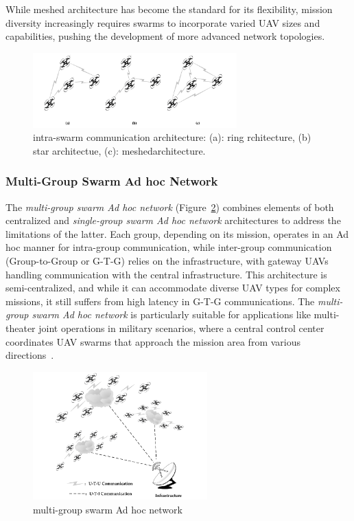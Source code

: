While meshed architecture has become the standard for its flexibility, mission diversity increasingly requires swarms to incorporate varied UAV sizes and capabilities, pushing the development of more advanced network topologies.





\begin{figure}[ht]
\centering
\includegraphics[width=0.7\textwidth]{Figures/Chapter1/Section5/3.png}
\caption{intra-swarm communication architecture: (a): ring rchitecture, (b) star architectue, (c): meshedarchitecture. \cite{Chen2020}}
\label{fig:intra-swarm communication architecture}
\end{figure}


\subsubsection{Multi-Group Swarm Ad hoc Network}

The \textit{multi-group swarm Ad hoc network} (Figure~\ref{fig:multi-group swarm Ad hoc network}) combines elements of both centralized and \textit{single-group swarm Ad hoc network} architectures to address the limitations of the latter. Each group, depending on its mission, operates in an Ad hoc manner for intra-group communication, while inter-group communication (Group-to-Group or G-T-G) relies on the infrastructure, with gateway UAVs handling communication with the central infrastructure. This architecture is semi-centralized, and while it can accommodate diverse UAV types for complex missions, it still suffers from high latency in G-T-G communications. The \textit{multi-group swarm Ad hoc network} is particularly suitable for applications like multi-theater joint operations in military scenarios, where a central control center coordinates UAV swarms that approach the mission area from various directions~\cite{kaleem2019uav}.


\begin{figure}[ht]
\centering
\includegraphics[width=0.6\textwidth]{Figures/Chapter1/Section5/4.png}
\caption{multi-group swarm Ad hoc network \cite{Chen2020}}
\label{fig:multi-group swarm Ad hoc network}
\end{figure}



